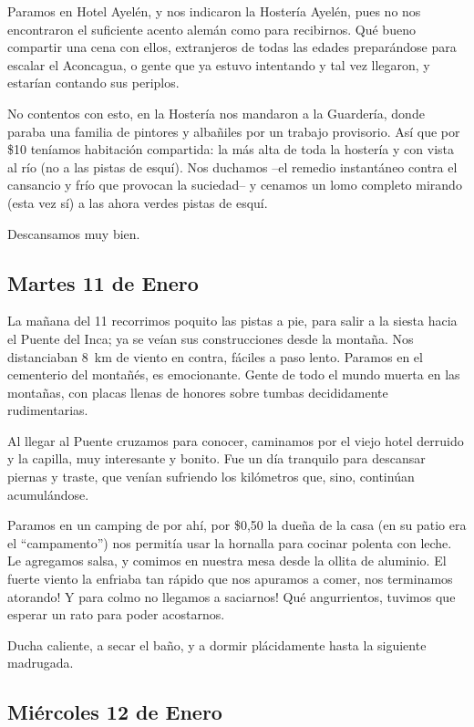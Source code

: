 Paramos en Hotel Ayel\'en, y nos indicaron la Hoster\'ia Ayel\'en, pues no nos
encontraron el suficiente acento alem\'an como para recibirnos. Qu\'e bueno
compartir una cena con ellos, extranjeros de todas las edades prepar\'andose
para escalar el Aconcagua, o gente que ya estuvo intentando y tal vez llegaron,
y estar\'ian contando sus periplos.

No contentos con esto, en la Hoster\'ia nos mandaron a la Guarder\'ia, donde
paraba una familia de pintores y alba\~niles por un trabajo provisorio. As\'i
que por \$10 ten\'iamos habitaci\'on compartida: la m\'as alta de toda la
hoster\'ia y con vista al r\'io (no a las pistas de esqu\'i). Nos duchamos --el
remedio instant\'aneo contra el cansancio y fr\'io que provocan la suciedad-- y
cenamos un lomo completo mirando (esta vez s\'i) a las ahora verdes pistas de
esqu\'i.

Descansamos muy bien.

\subsection*{Martes 11 de Enero}

La ma\~nana del 11 recorrimos poquito las pistas a pie, para salir a la siesta
hacia el Puente del Inca; ya se ve\'ian sus construcciones desde la monta\~na.
Nos distanciaban 8~km de viento en contra, f\'aciles a paso lento. Paramos en el
cementerio del monta\~n\'es, es emocionante. Gente de todo el mundo muerta en
las monta\~nas, con placas llenas de honores sobre tumbas decididamente
rudimentarias.

Al llegar al Puente cruzamos para conocer, caminamos por el viejo hotel derruido
y la capilla, muy interesante y bonito. Fue un d\'ia tranquilo para descansar
piernas y traste, que ven\'ian sufriendo los kil\'ometros que, sino, contin\'uan
acumul\'andose.

Paramos en un camping de por ah\'i, por \$0,50 la due\~na de la casa (en su
patio era el ``campamento'') nos permit\'ia usar la hornalla para cocinar
polenta con leche. Le agregamos salsa, y comimos en nuestra mesa desde la ollita
de aluminio. El fuerte viento la enfriaba tan r\'apido que nos apuramos a comer,
\textexclamdown nos terminamos atorando! \textexclamdown Y para colmo no
llegamos a saciarnos! Qu\'e angurrientos, tuvimos que esperar un rato para poder
acostarnos.

Ducha caliente, a secar el ba\~no, y a dormir pl\'acidamente hasta la siguiente
madrugada.

\subsection*{Mi\'ercoles 12 de Enero}

